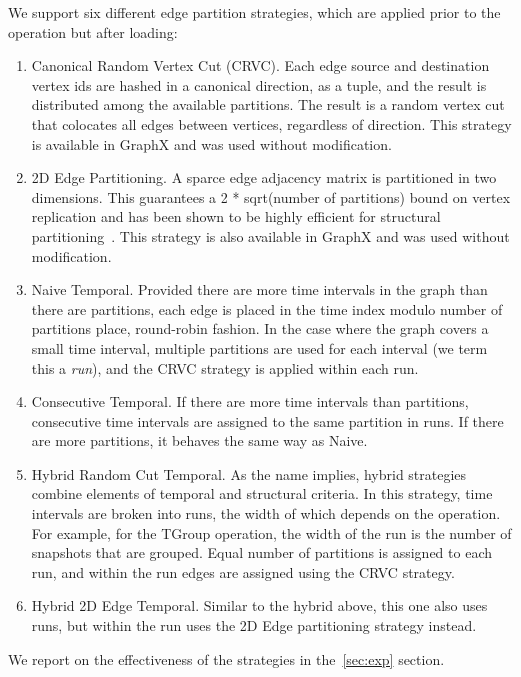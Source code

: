 We support six different edge partition strategies, which are
applied prior to the operation but after loading:
\begin{enumerate}
\item Canonical Random Vertex Cut (CRVC).  Each edge source and destination
  vertex ids are hashed in a canonical direction, as a tuple, and the
  result is distributed among the available partitions.  The result is
  a random vertex cut that colocates all edges between vertices,
  regardless of direction.  This strategy is available in GraphX and
  was used without modification.
\item 2D Edge Partitioning.  A sparce edge adjacency matrix is
  partitioned in two dimensions.  This guarantees a 2 * sqrt(number of
  partitions) bound on vertex replication and has been shown to be
  highly efficient for structural partitioning~\cite{}.  This strategy
  is also available in GraphX and was used without modification.
\item Naive Temporal.  Provided there are more time intervals in the
  graph than there are partitions, each edge is placed in the time
  index modulo number of partitions place, round-robin fashion.  In
  the case where the graph covers a small time interval, multiple
  partitions are used for each interval (we term this a {\em run}),
  and the CRVC strategy is applied within each run.
\item Consecutive Temporal.  If there are more time intervals than
  partitions, consecutive time intervals are assigned to the same
  partition in runs.  If there are more partitions, it behaves the
  same way as Naive.
\item Hybrid Random Cut Temporal.  As the name implies, hybrid
  strategies combine elements of temporal and structural criteria.  In
  this strategy, time intervals are broken into runs, the width of
  which depends on the operation.  For example, for the TGroup
  operation, the width of the run is the number of snapshots that are
  grouped.  Equal number of partitions is assigned to each run, and
  within the run edges are assigned using the CRVC strategy.
\item Hybrid 2D Edge Temporal.  Similar to the hybrid above, this one
  also uses runs, but within the run uses the 2D Edge partitioning
  strategy instead.
\end{enumerate}

We report on the effectiveness of the strategies in the~\ref{sec:exp}
section.


